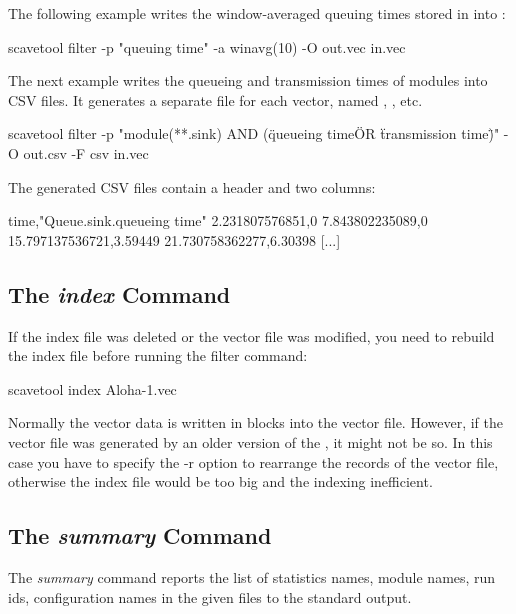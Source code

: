 The following example writes the window-averaged queuing times stored
in  into :

\begin{commandline}
scavetool filter -p "queuing time" -a winavg(10) -O out.vec in.vec
\end{commandline}

The next example writes the queueing and transmission times of 
modules into CSV files. It generates a separate file for each vector,
named , , etc.

\begin{commandline}
scavetool filter -p "module(**.sink) AND
                    (\"queueing time\" OR \"transmission time\")"
                 -O out.csv -F csv in.vec
\end{commandline}

The generated CSV files contain a header and two columns:

\begin{filelisting}
time,"Queue.sink.queueing time"
2.231807576851,0
7.843802235089,0
15.797137536721,3.59449
21.730758362277,6.30398
[...]
\end{filelisting}


\subsection{The \textit{index} Command}

If the index file was deleted or the vector file was modified, you need to
rebuild the index file before running the filter command:

\begin{commandline}
scavetool index Aloha-1.vec
\end{commandline}

Normally the vector data is written in blocks into the vector file.
However, if the vector file was generated by an older version of the
, it might not be so. In this case you have
to specify the -r option to rearrange the records of the vector file,
otherwise the index file would be too big and the indexing inefficient.

\subsection{The \textit{summary} Command}

The \textit{summary} command reports the list of statistics names, module names,
run ids, configuration names in the given files to the standard output.

